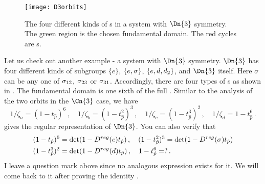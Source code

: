 \begin{figure}[h]
  \centering
  \texttt{[image: D3orbits]}
  \caption[Orbits in a system with $\Dn{3}$ symmetry.]{
    The four different kinds of \po s in a system with
    $\Dn{3}$ symmetry.
    The green region is the chosen fundamental domain.
    The red cycles are \po s.
  }
  \label{fig:D3orbits}
\end{figure}

Let us check out another example - a system with $\Dn{3}$ symmetry.
$\Dn{3}$ has four different kinds of subgroups $\{e\}$, $\{e, \sigma\}$,
$\{e, d, d_2\}$, and $\Dn{3}$ itself. Here $\sigma$ can be
any one of $\sigma_{12}$, $\sigma_{23}$ or $\sigma_{31}$. Accordingly,
there are four types of \po s as shown in .
The fundamental domain is one sixth of the full \statesp.
Similar to the analysis of the two orbits in the $\Cn{3}$ case, we have
\[
  1/\zeta_a = (1 - t_{\hat{p}})^6
  \,,\quad
  1/\zeta_b = (1 - t_{\hat{p}}^2)^3
  \,,\quad
  1/\zeta_c = (1 - t_{\hat{p}}^3)^2
  \,,\quad
  1/\zeta_d = 1 - t_{\hat{p}}^6
  \,.
\]
 gives the regular representation of $\Dn{3}$.
You can also verify that
\begin{align*}
   & (1 - t_{\hat{p}})^6 = \det(1 - D^{reg}(e)t_{\hat{p}}) \,, \quad
     (1 - t_{\hat{p}}^2)^3 = \det(1 - D^{reg}(\sigma)t_{\hat{p}}) \\
   & (1 - t_{\hat{p}}^3)^2 = \det(1 - D^{reg}(d)t_{\hat{p}})\,,\quad
     1 - t_{\hat{p}}^6 = ?
     \,.
\end{align*}
I leave a question mark above since no analogous expression exists for it.
We will come back to it after proving
the identity .

